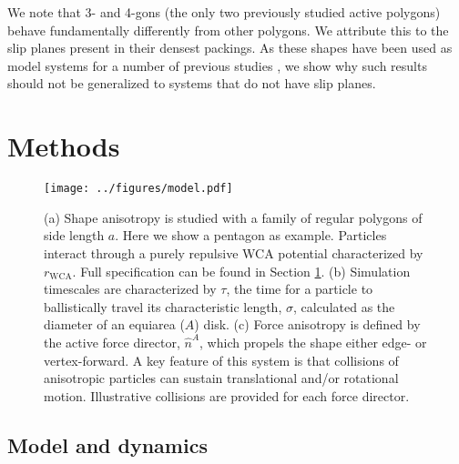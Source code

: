 We note that 3- and 4-gons (the only two previously studied active polygons) behave fundamentally differently from other polygons.
We attribute this to the slip planes present in their densest packings.
As these shapes have been used as model systems for a number of previous studies \cite{Wensink_2014_PRE,Ilse_2016_JChemPhys,Prymidis_2016_SoftMatter}, we show why such results should not be generalized to systems that do not have slip planes.



\section{Methods}
\label{sec:methods}

\begin{figure}[t]
\begin{center}
\texttt{[image: ../figures/model.pdf]}
\caption{
(a) Shape anisotropy is studied with a family of regular polygons of side length $a$.
Here we show a pentagon as example.
Particles interact through a purely repulsive WCA potential characterized by $r_\text{WCA}$.
Full specification can be found in Section \ref{sec:methods}.
(b) Simulation timescales are characterized by $\tau$, the time for a particle to ballistically travel its characteristic length, $\sigma$, calculated as the diameter of an equiarea ($A$) disk.
(c) Force anisotropy is defined by the active force director, $\hat{n}^A$, which propels the shape either edge- or vertex-forward.
A key feature of this system is that collisions of anisotropic particles can sustain translational and/or rotational motion.
Illustrative collisions are provided for each force director.
}
\label{fig:model}
\end{center}
\end{figure}


\subsection{Model and dynamics}

